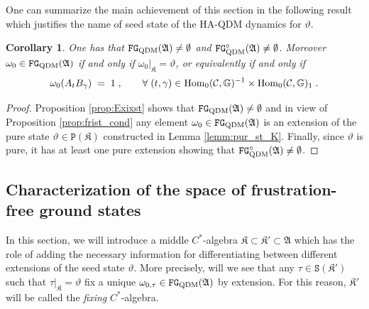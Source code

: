 \documentclass[a4paper,12pt,twoside,reqno]{amsart}
\theoremstyle{plain}
\newtheorem{cor}[teo]{Corollary}
\theoremstyle{definition}
\theoremstyle{remark}
\numberwithin{equation}{section}
\numberwithin{figure}{section}
\numberwithin{table}{section}
\newcommand{\f}[1]{\mathcal{#1}}
\newcommand{\n}[1]{\mathbb{#1}}
\begin{document}
	
	
	
	
	One can summarize the main achievement of this section in the following result
	which justifies the name of seed state of the {HA-QDM dynamics} for $\vartheta$.
	
	
	
	
	
	\begin{cor}\label{cor_summ}
		One has that $\mathtt{FG}_{\rm QDM}(\mathfrak{A})\neq \emptyset$ and $\mathtt{FG}_{\rm QDM}^{{\circ}}(\mathfrak{A})\neq \emptyset$. Moreover 
		$\omega_0\in \mathtt{FG}_{\rm QDM}(\mathfrak{A})$  if and only if 
		$\omega_0|_{\mathfrak{K}}=\vartheta$, or equivalently if and only if 
		\begin{equation*}
			\omega_0(A_tB_\gamma)\;=\;1\;, \qquad \forall \;(t,\gamma)\in {\rm Hom}_0(\f{C},\n{G})^{-1}\times {\rm Hom}_0(\f{C},\n{G})_1\;.
		\end{equation*}
	\end{cor}
	
	
	
	\begin{proof}
		Proposition \ref{prop:Exixst} shows that $\mathtt{FG}_{\rm QDM}(\mathfrak{A})\neq \emptyset$ and in view of Proposition \ref{prop:frist_cond} any element $\omega_0\in \mathtt{FG}_{\rm QDM}(\mathfrak{A})$ is an extension of the pure state $\vartheta\in\mathtt{P}(\mathfrak{K})$ constructed in Lemma \ref{lemm:pur_st_K}. Finally, since $\vartheta$ is pure, it has at least one pure extension \cite[Proposition 2.3.24]{Bratelli} showing that 
		$\mathtt{FG}_{\rm QDM}^{{\circ}}(\mathfrak{A})\neq \emptyset$.
	\end{proof}
	
	
	
	\subsection{Characterization of the space of frustration-free ground states}
	In this section, we will introduce a middle $C^*$-algebra 
	$\mathfrak{K}\subset \mathfrak{K}'\subset \mathfrak{A}$
	which has the role of adding the necessary information 
	for differentiating between different extensions of the seed state $\vartheta$. More precisely, will we see that any $\tau\in \mathtt{S}(\mathfrak{K}')$ such that $\tau|_{\mathfrak{K}}=\vartheta$
	fix a unique $\omega_{0,\tau}\in \mathtt{FG}_{\rm QDM}(\mathfrak{A})$ by extension. For this reason, $\mathfrak{K}'$ will be called the \emph{fixing} $C^*$-algebra.
	
\end{document}
